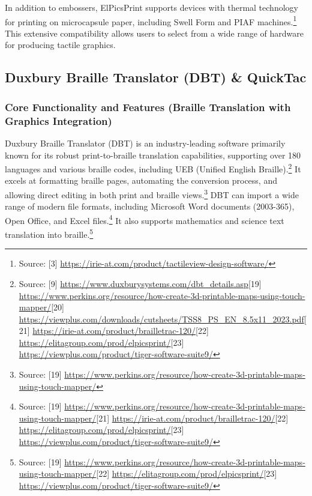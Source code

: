 In addition to embossers, ElPicsPrint supports devices with thermal technology for printing on microcapsule paper, including Swell Form and PIAF machines.\footnote{Source: [3] \url{https://irie-at.com/product/tactileview-design-software/}} This extensive compatibility allows users to select from a wide range of hardware for producing tactile graphics.

\subsection{Duxbury Braille Translator (DBT) \& QuickTac}

\subsubsection{Core Functionality and Features (Braille Translation with Graphics Integration)}

Duxbury Braille Translator (DBT) is an industry-leading software primarily known for its robust print-to-braille translation capabilities, supporting over 180 languages and various braille codes, including UEB (Unified English Braille).\footnote{Source: [9] \url{https://www.duxburysystems.com/dbt_details.asp}[19] \url{https://www.perkins.org/resource/how-create-3d-printable-maps-using-touch-mapper/}[20] \url{https://viewplus.com/downloads/cutsheets/TSS8_PS_EN_8.5x11_2023.pdf}[21] \url{https://irie-at.com/product/brailletrac-120/}[22] \url{https://elitagroup.com/prod/elpicsprint/}[23] \url{https://viewplus.com/product/tiger-software-suite9/}} It excels at formatting braille pages, automating the conversion process, and allowing direct editing in both print and braille views.\footnote{Source: [19] \url{https://www.perkins.org/resource/how-create-3d-printable-maps-using-touch-mapper/}} DBT can import a wide range of modern file formats, including Microsoft Word documents (2003-365), Open Office, and Excel files.\footnote{Source: [19] \url{https://www.perkins.org/resource/how-create-3d-printable-maps-using-touch-mapper/}[21] \url{https://irie-at.com/product/brailletrac-120/}[22] \url{https://elitagroup.com/prod/elpicsprint/}[23] \url{https://viewplus.com/product/tiger-software-suite9/}} It also supports mathematics and science text translation into braille.\footnote{Source: [19] \url{https://www.perkins.org/resource/how-create-3d-printable-maps-using-touch-mapper/}[22] \url{https://elitagroup.com/prod/elpicsprint/}[23] \url{https://viewplus.com/product/tiger-software-suite9/}}

